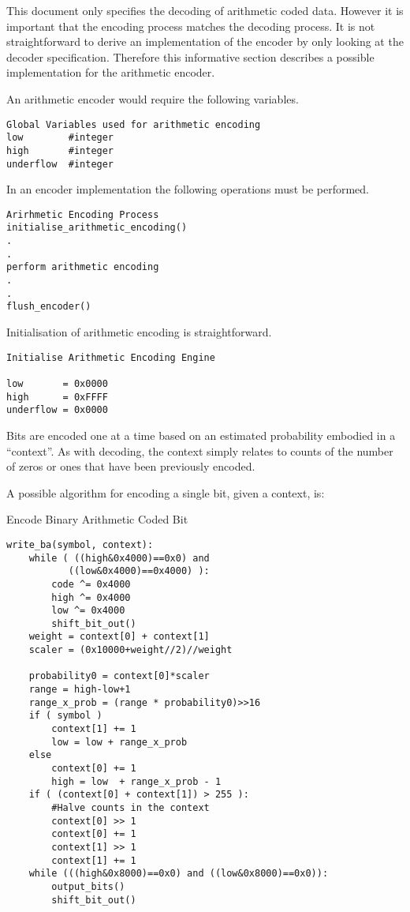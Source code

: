 

This document only specifies the decoding of arithmetic coded data.
However it is important that the encoding process matches the decoding
process. It is not straightforward to derive an implementation of the
encoder by only looking at the decoder specification. Therefore this
informative section describes a possible implementation for the
arithmetic encoder.

An arithmetic encoder would require the following variables.

\begin{verbatim}
Global Variables used for arithmetic encoding
low        #integer
high       #integer
underflow  #integer
\end{verbatim}

In an encoder implementation the following operations must be performed.

\begin{verbatim}
Arirhmetic Encoding Process
initialise_arithmetic_encoding()
.
.
perform arithmetic encoding
.
.
flush_encoder()
\end{verbatim}

Initialisation of arithmetic encoding is straightforward.

\begin{verbatim}
Initialise Arithmetic Encoding Engine

low       = 0x0000
high      = 0xFFFF
underflow = 0x0000
\end{verbatim}

Bits are encoded one at a time based on an estimated probability
embodied in a ``context''. As with decoding, the context simply relates to
counts of the number of zeros or ones that have been previously encoded.

A possible algorithm for encoding a single bit, given a context, is:

Encode Binary Arithmetic Coded Bit
\begin{verbatim}
write_ba(symbol, context):
    while ( ((high&0x4000)==0x0) and
           ((low&0x4000)==0x4000) ):
        code ^= 0x4000
        high ^= 0x4000
        low ^= 0x4000
        shift_bit_out()
    weight = context[0] + context[1]
    scaler = (0x10000+weight//2)//weight

    probability0 = context[0]*scaler
    range = high-low+1
    range_x_prob = (range * probability0)>>16
    if ( symbol )
        context[1] += 1
        low = low + range_x_prob
    else
        context[0] += 1
        high = low  + range_x_prob - 1
    if ( (context[0] + context[1]) > 255 ):
        #Halve counts in the context
        context[0] >> 1
        context[0] += 1
        context[1] >> 1
        context[1] += 1
    while (((high&0x8000)==0x0) and ((low&0x8000)==0x0)):
        output_bits()
        shift_bit_out()
\end{verbatim}

